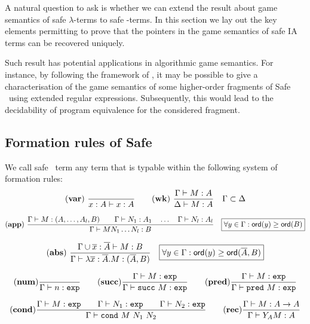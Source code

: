 A natural question to ask is whether we can extend the result about
game semantics of safe $\lambda$-terms to safe \ialgol-terms. In
this section we lay out the key elements permitting to prove that
the pointers in the game semantics of safe IA terms can be recovered
uniquely.

Such result has potential applications in algorithmic game semantics.
For instance, by following the framework of \cite{ghicamccusker00},
it may be possible to give a characterisation of the game semantics
of some higher-order fragments of Safe \ialgol\ using extended
regular expressions. Subsequently, this would lead to the
decidability of program equivalence for the considered fragment.


\subsection{Formation rules of Safe \ialgol}
We call safe \ialgol\ term any term that is typable within the
following system of formation rules:
$$ \mathbf{(var)} \   \frac{\displaystyle }{x : A\vdash x : A}
\qquad  \mathbf{(wk)} \   \frac{\displaystyle \Gamma \vdash M : A}{\Delta \vdash
M : A} \quad  \Gamma \subset \Delta$$

$$ \mathbf{(app)} \  \frac{\displaystyle \Gamma \vdash M : (A,\ldots,A_l,B)
                                        \qquad \Gamma \vdash N_1 : A_1
                                        \quad \ldots \quad \Gamma \vdash N_l : A_l  }{\Gamma  \vdash M N_1 \ldots N_l : B}
                                    \quad
\mbox{\fbox{$\forall y \in \Gamma : {\sf ord}(y) \geq {\sf ord}(B)$}}$$

$$ \mathbf{(abs)} \   \frac{\displaystyle \Gamma \cup \overline{x} : \overline{A} \vdash M : B}{\Gamma  \vdash \lambda \overline{x} : \overline{A} . M : (\overline{A},B)} \quad
\mbox{\fbox{$\forall y \in \Gamma : {\sf ord}(y) \geq {\sf ord}(\overline{A},B)$}}$$

$$ \mathbf{(num)} \frac{\displaystyle }{\Gamma \vdash n :\texttt{exp}}
\qquad \mathbf{(succ)} \frac{\displaystyle \Gamma \vdash M:\texttt{exp} }{\Gamma
\vdash \texttt{succ}\ M:\texttt{exp}} \qquad \mathbf{(pred)}
\frac{\displaystyle \Gamma \vdash M:\texttt{exp} }{\Gamma \vdash \texttt{pred}\
M:\texttt{exp}}$$

$$
\mathbf{(cond)} \frac{\displaystyle \Gamma \vdash M : \texttt{exp} \qquad \Gamma
\vdash N_1 : \texttt{exp} \qquad \Gamma \vdash N_2 : \texttt{exp}
}{\Gamma \vdash \texttt{cond}\ M\ N_1\ N_2} \qquad  \mathbf{(rec)}
\frac{\displaystyle \Gamma \vdash M : A\rightarrow A }{ \Gamma \vdash Y_A M :
A}$$


